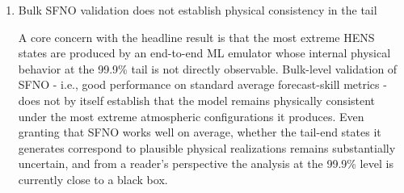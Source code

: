 \documentclass[11pt]{article}
\newcommand{\newTxt}{\textcolor{cadmiumgreen}}
\begin{document}
\begin{enumerate}

\newTxt{\sl We also restrict our analysis to a single ML emulator, carefully designed and validated to be fit-for-purpose for this science question. Exploring other models is nontrivial: they are generally less validated, lack a readily available ensemble analogue, and in any case share SFNO's characteristics (same training data, same spatial and temporal resolution). Future huge ensembles should use ML models trained end-to-end as ensemble forecasts, evaluated with the extreme diagnostics pipeline of \cite{Mahesh2024hugeensemblesidesign} before such experiments are conducted.}
\vspace{1ex}

\item Bulk SFNO validation does not establish physical consistency in the tail

A core concern with the headline result is that the most extreme HENS states are produced by an end-to-end ML emulator whose internal physical behavior at the 99.9\% tail is not directly observable. Bulk-level validation of SFNO - i.e., good performance on standard average forecast-skill metrics - does not by itself establish that the model remains physically consistent under the most extreme atmospheric configurations it produces. Even granting that SFNO works well on average, whether the tail-end states it generates correspond to plausible physical realizations remains substantially uncertain, and from a reader's perspective the analysis at the 99.9\% level is currently close to a black box.


\end{enumerate}
\end{document}
